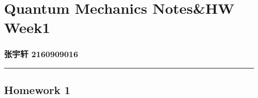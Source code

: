 \section*{Quantum Mechanics Notes&HW Week1}
    \setcounter{section}{1}
    \vspace{-5pt}\subsubsection*{张宇轩 2160909016}
    \vspace{-10pt}\noindent\rule{\textwidth}{0.1pt}
    \vspace{-30pt}
    \subsection{Homework 1}